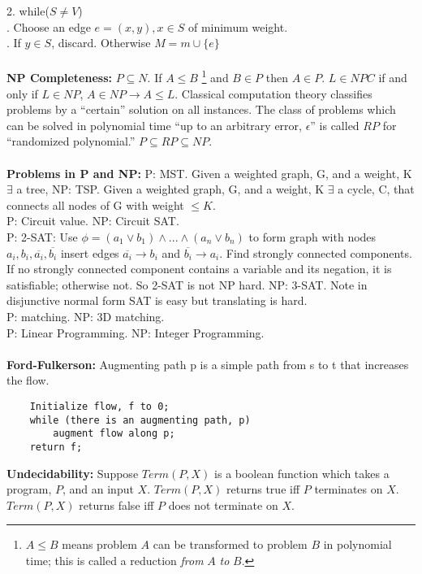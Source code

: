2. while($S \ne V$) \\
. Choose an edge $e=(x, y), x \in S$ of minimum weight.\\
. If $y \in S$, discard.  Otherwise $M= m \cup \{e\}$
\\
\\
{\bf NP Completeness:}
$P \subseteq N$.  If $A \le B$ 
\footnote{$A \le B$ means problem $A$ can be transformed to problem $B$ in polynomial time;
this is called a reduction \emph {from} $A$ \emph{to} $B$.}
and $B \in P$ then $A \in P$.  $L \in NPC$ if and only if 
$L \in NP$, $A \in NP \rightarrow A \le L$.  Classical computation theory classifies
problems by a ``certain'' solution on all instances.  The class of problems which
can be solved in polynomial time
``up to an arbitrary error, $\epsilon$'' is called $RP$ for ``randomized
polynomial.''  $P \subseteq RP \subseteq NP$.
\\
\\
{\bf Problems in P and NP:}
P: MST.  Given a weighted graph, G, and a weight, K $\exists$ a tree,
NP: TSP.  Given a weighted graph, G, and a weight, K $\exists$ a cycle,
C, that connects all nodes  of G with weight $\leq K$.\\
P: Circuit value.  NP: Circuit SAT.\\
P: 2-SAT: Use $\phi= (a_1 \vee b_1  )  \wedge ... \wedge (a_n \vee b_n )$ to form graph with 
nodes $a_i, b_i, {\overline {a_i}}, {\overline {b_i}}$ insert
edges ${\overline {a_i}} \rightarrow b_i$
and ${\overline {b_i}} \rightarrow a_i$.  Find strongly connected components.  If no
strongly connected component contains a variable and its negation, it is satisfiable;
otherwise not.  So 2-SAT is not NP hard.  NP: 3-SAT.  Note in disjunctive normal form 
SAT is easy but translating is hard.
\\
P: matching.  NP: 3D matching.\\
P: Linear Programming.   NP: Integer Programming.\\
\\
{\bf Ford-Fulkerson:} Augmenting path p is a simple path from s to t that
increases the flow.
\begin{verbatim}
    Initialize flow, f to 0;
    while (there is an augmenting path, p)
        augment flow along p;
    return f;
\end{verbatim}
{\bf Undecidability:} Suppose $Term(P,X)$ is a boolean function which takes a program,
$P$, and an input $X$.
$Term(P,X)$ returns true iff $P$ terminates on $X$.
$Term(P,X)$ returns false iff $P$ does not terminate on $X$.
